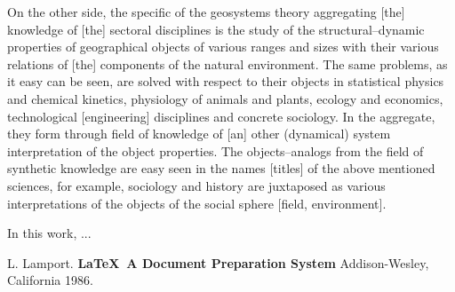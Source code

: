 \documentclass[12pt,leqno]{book}
\begin{document}
On the other side, the specific of the geosystems theory aggregating [the] knowledge of [the] sectoral disciplines is the study of the structural--dynamic properties of geographical objects of various ranges and sizes with their various relations of [the] components of the natural environment. The same problems, as it easy can be seen, are solved with respect to their objects in statistical physics and chemical kinetics, physiology of animals and plants, ecology and economics, technological [engineering] disciplines and concrete sociology. In the aggregate, they form through field of knowledge of [an] other (dynamical) system interpretation of the object properties. The objects--analogs from the field of synthetic knowledge are easy seen in the names [titles] of the above mentioned sciences, for example, sociology and history are juxtaposed as various interpretations of the objects of the social sphere [field, environment].

In this work, ...





\pagestyle{headings}




\begin{thebibliography}{99}
 L. Lamport. {\bf \LaTeX \ A Document Preparation System}
Addison-Wesley, California 1986.
\end{thebibliography}
\listoffigures
\listoftables

\end{document}
